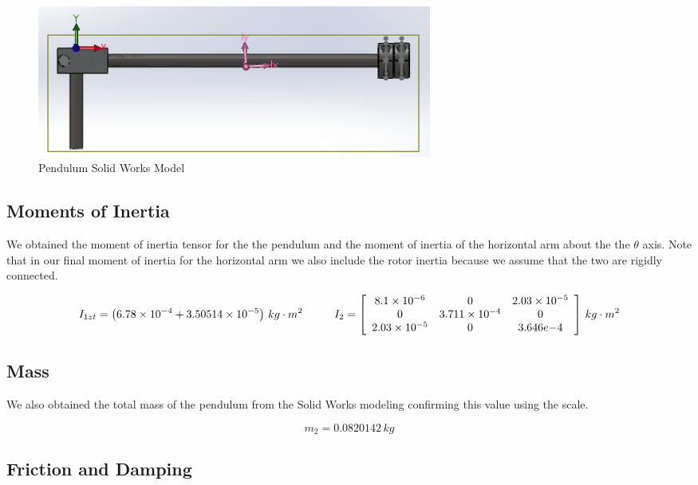 \documentclass{article}
\theoremstyle{plain}
\theoremstyle{definition}
\theoremstyle{remark}
\providecommand{\e}[1]{\ensuremath{\times 10^{#1}}}
\begin{document}
\begin{figure}
\begin{center}
\includegraphics[width = 13cm]{Pendulum.png}
\end{center}
\caption{Pendulum Solid Works Model}
\label{PendulumCAD}
\end{figure}

\subsection*{Moments of Inertia}

We obtained the moment of inertia tensor for the the pendulum and the moment of inertia of the horizontal arm about the the $\theta$ axis.  Note that in our final moment of inertia for the horizontal arm we also include the rotor inertia because we assume that the two are rigidly connected.  

$$ I_{1zt} = \left(6.78 \e{-4} + 3.50514 \e{-5} \right) \, kg \cdot m^2\hspace{1cm} 
I_{2} = \left[ \begin{array}{c c c l} 
8.1\e{-6} & 0 & 2.03\e{-5} \\   
0 & 3.711\e{-4} & 0 \\
2.03\e{-5} & 0 & 3.646e{-4} \\
\end{array} \right] \, kg \cdot m^2$$

\subsection*{Mass}

We also obtained the total mass of the pendulum from the Solid Works modeling confirming this value using the scale.

$$ m_2 = 0.0820142 \, kg $$

\subsection*{Friction and Damping}
\end{document}
